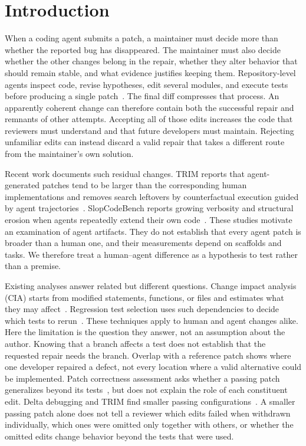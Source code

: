 \documentclass[a4paper,fleqn]{cas-sc}
\begin{document}
\section{Introduction}\label{sec:introduction}

When a coding agent submits a patch, a maintainer must decide more than whether the reported bug has disappeared. The maintainer must also decide whether the other changes belong in the repair, whether they alter behavior that should remain stable, and what evidence justifies keeping them. Repository-level agents inspect code, revise hypotheses, edit several modules, and execute tests before producing a single patch~\citep{yang2024sweagent,bouzenia2025trajectories}. The final diff compresses that process. An apparently coherent change can therefore contain both the successful repair and remnants of other attempts. Accepting all of those edits increases the code that reviewers must understand and that future developers must maintain. Rejecting unfamiliar edits can instead discard a valid repair that takes a different route from the maintainer's own solution.

Recent work documents such residual changes. TRIM reports that agent-generated patches tend to be larger than the corresponding human implementations and removes search leftovers by counterfactual execution guided by agent trajectories~\citep{mathai2026trim}. SlopCodeBench reports growing verbosity and structural erosion when agents repeatedly extend their own code~\citep{orlanski2026slopcodebench}. These studies motivate an examination of agent artifacts. They do not establish that every agent patch is broader than a human one, and their measurements depend on scaffolds and tasks. We therefore treat a human--agent difference as a hypothesis to test rather than a premise.

Existing analyses answer related but different questions. Change impact analysis (CIA) starts from modified statements, functions, or files and estimates what they may affect~\citep{bohner1996cia,li2013cia}. Regression test selection uses such dependencies to decide which tests to rerun~\citep{rothermel1997safe,gligoric2015ekstazi}. These techniques apply to human and agent changes alike. Here the limitation is the question they answer, not an assumption about the author. Knowing that a branch affects a test does not establish that the requested repair needs the branch. Overlap with a reference patch shows where one developer repaired a defect, not every location where a valid alternative could be implemented. Patch correctness assessment asks whether a passing patch generalizes beyond its tests~\citep{qi2015kali,smith2015cure}, but does not explain the role of each constituent edit. Delta debugging and TRIM find smaller passing configurations~\citep{zeller2002ddmin,mathai2026trim}. A smaller passing patch alone does not tell a reviewer which edits failed when withdrawn individually, which ones were omitted only together with others, or whether the omitted edits change behavior beyond the tests that were used.
\end{document}
